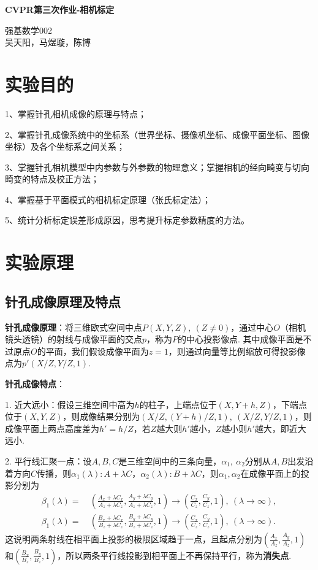 \documentclass[12pt, a4paper, oneside]{ctexart}
\numberwithin{equation}{section}  %
\renewenvironment{title}[1]{
    \begin{center}
    {\zihao{-2}\bf #1\\}
    \zihao{-4}\it
}{\end{center}}  %
\def\add{\vspace{1ex}}      %
\begin{document}
\begin{title}{CVPR第三次作业-相机标定}
    强基数学002\\
    吴天阳，马煜璇，陈博
\end{title}
\section{实验目的}
1、掌握针孔相机成像的原理与特点；

2、掌握针孔成像系统中的坐标系（世界坐标、摄像机坐标、成像平面坐标、图像坐标）及各个坐标系之间关系；

3、掌握针孔相机模型中内参数与外参数的物理意义；掌握相机的经向畸变与切向畸变的特点及校正方法；

4、掌握基于平面模式的相机标定原理（张氏标定法）；

5、统计分析标定误差形成原因，思考提升标定参数精度的方法。
\section{实验原理}
\subsection{针孔成像原理及特点}
\textbf{针孔成像原理}：将三维欧式空间中点$P(X,Y,Z),\ (Z\neq 0)$，通过中心$O$（相机镜头透镜）的射线与成像平面的交点$p$，称为$P$的中心投影像点. 其中成像平面是不过原点$O$的平面，我们假设成像平面为$z=1$，则通过向量等比例缩放可得投影像点为$p'(X/Z,Y/Z,1)$.

\textbf{针孔成像特点}：

1. 近大远小：假设三维空间中高为$h$的柱子，上端点位于$(X,Y+h, Z)$，下端点位于$(X,Y,Z)$，则成像结果分别为$(X/Z,(Y+h)/Z,1),\ (X/Z,Y/Z,1)$，则成像平面上两点高度差为$h'=h/Z$，若$Z$越大则$h'$越小，$Z$越小则$h'$越大，即近大远小.

2. 平行线汇聚一点：设$A,B,C$是三维空间中的三条向量，$\alpha_1,\ \alpha_2$分别从$A,B$出发沿着方向$C$传播，则$\alpha_1(\lambda):A+\lambda C$，$\alpha_2(\lambda):B+\lambda C$，则$\alpha_1,\alpha_2$在成像平面上的投影分别为
\begin{align*}
    \beta_1(\lambda) =&\ \left(\frac{A_x+\lambda C_x}{A_z+\lambda C_z},\frac{A_y+\lambda C_y}{A_z+\lambda C_z},1\right)\to \left(\frac{C_x}{C_z},\frac{C_y}{C_z},1\right),\ (\lambda \to \infty),\\
    \beta_1(\lambda) =&\ \left(\frac{B_x+\lambda C_x}{B_z+\lambda C_z},\frac{B_y+\lambda C_y}{B_z+\lambda C_z},1\right)\to \left(\frac{C_x}{C_z},\frac{C_y}{C_z},1\right),\ (\lambda \to \infty).
\end{align*}
这说明两条射线在相平面上投影的极限区域趋于一点，且起点分别为$\left(\frac{A_x}{A_z},\frac{A_y}{A_z},1\right)$和$\left(\frac{B_x}{B_z},\frac{B_y}{B_z},1\right)$，所以两条平行线投影到相平面上不再保持平行，称为\textbf{消失点}.\add
\end{document}
